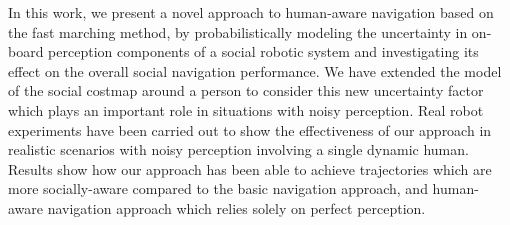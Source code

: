 In this work, we present a novel approach to human-aware navigation based on the fast marching method, by probabilistically modeling the uncertainty in on-board perception components of a social robotic system and investigating its effect on the overall social navigation performance. We have extended the model of the social costmap around a person to consider this new uncertainty factor which plays an important role in situations with noisy perception. Real robot experiments have been carried out to show the effectiveness of our approach in realistic scenarios with noisy perception involving a single dynamic human. Results show how our approach has been able to achieve trajectories which are more socially-aware compared to the basic navigation approach, and human-aware navigation approach which relies solely on perfect perception.


